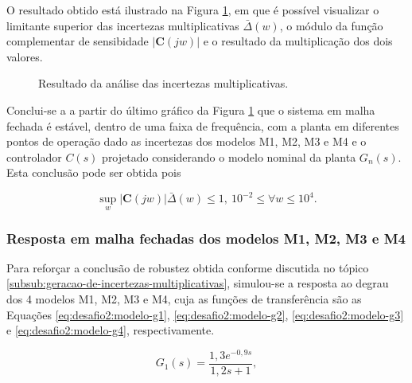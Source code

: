 O resultado obtido está ilustrado na Figura
\ref{fig:desafio-2:resultado-questao-3-4}, em que é possível visualizar o
limitante superior das incertezas multiplicativas $\bar{\Delta}(w)$, o módulo da
função complementar de sensibidade $|\boldsymbol{C}(jw)|$ e o resultado da
multiplicação dos dois valores.

\begin{figure}[!ht]
    \caption{Resultado da análise das incertezas multiplicativas.}
    \vspace{-10pt}
    \hspace{-30pt}
    \label{fig:desafio-2:resultado-questao-3-4}
    \begin{minipage}{\linewidth}
        
    \end{minipage}
\end{figure}

Conclui-se a a partir do último gráfico da Figura
\ref{fig:desafio-2:resultado-questao-3-4} que o sistema em malha fechada é
estável, dentro de uma faixa de frequência, com a planta em diferentes pontos de
operação dado as incertezas dos modelos M1, M2, M3 e M4 e o controlador $C(s)$
projetado considerando o modelo nominal da planta $G_{n}(s)$. Esta conclusão
pode ser obtida pois

\begin{equation}
    \label{eq:desafio-2:principio-do-modelo-interno}
    \sup_{w}|\boldsymbol{C}(jw)|\bar{\Delta}(w) \le 1, \ 10^{-2} \leq \forall w \leq {10^{4}}.
\end{equation}

\subsubsection{Resposta em malha fechadas dos modelos M1, M2, M3 e M4}
\label{subsub:desafio2:resposta-em-malha-fechadas-dos-modelos-m1-m2-m3-e-m4}
Para reforçar a conclusão de robustez obtida conforme discutida no tópico
\ref{subsub:geracao-de-incertezas-multiplicativas}, simulou-se a resposta ao
degrau dos 4 modelos M1, M2, M3 e M4, cuja as funções de transferência são as
Equações \ref{eq:desafio2:modelo-g1}, \ref{eq:desafio2:modelo-g2},
\ref{eq:desafio2:modelo-g3} e \ref{eq:desafio2:modelo-g4}, respectivamente.

\begin{equation}
    \label{eq:desafio2:modelo-g1}
    G_{1}(s) = \frac{1,3e^{-0,9s}}{1,2s + 1},
\end{equation}

